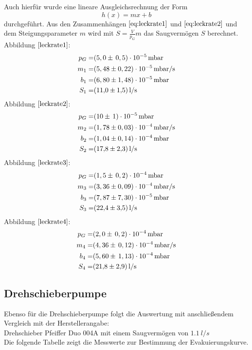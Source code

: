Auch hierfür wurde eine lineare Ausgleichsrechnung der Form
\begin{equation}
	h(x)=mx+b
\end{equation}
durchgeführt.
Aus den Zusammenhängen $\ref{eq:leckrate1}$ und $\ref{eq:leckrate2}$ und dem Steigungsparameter $m$ wird mit $S=\frac{V}{p_G}m$
das Saugvermögen $S$ berechnet.\\

Abbildung $\ref{leckrate1}$:
	\begin{align*}
		p_G=& (5,0 \pm \, 0,5)\cdot 10^{-5} \, \si{mbar}\\
		m_1=& (5,48 \pm 0,22)\cdot 10^{-5} \, \si{mbar/s}\\
		b_1=& (6,80 \pm 1,48)\cdot 10^{-5} \, \si{mbar}\\
		S_1=& \SI{11,0 \pm 1,5}{l/s}
	\end{align*}
	Abbildung $\ref{leckrate2}$:
		\begin{align*}
			p_G=& (10 \pm \, 1)\cdot 10^{-5} \, \si{mbar}\\
			m_2=& (1,78 \pm 0,03)\cdot 10^{-4} \, \si{mbar/s}\\
			b_2=& (1,04 \pm 0,14)\cdot 10^{-4} \, \si{mbar}\\
			S_2=& \SI{17,8 \pm 2,3}{l/s}
		\end{align*}
		Abbildung $\ref{leckrate3}$:
			\begin{align*}
				p_G=& (1,5 \pm \, 0,2)\cdot 10^{-4} \, \si{mbar}\\
				m_3=& (3,36 \pm 0,09)\cdot 10^{-4} \, \si{mbar/s}\\
				b_3=& (7,87 \pm 7,30)\cdot 10^{-5} \, \si{mbar}\\
				S_3=& \SI{22,4 \pm 3,5}{l/s}
			\end{align*}
		Abbildung $\ref{leckrate4}$:
			\begin{align*}
				p_G=& (2,0 \pm \, 0,2)\cdot 10^{-4} \, \si{mbar}\\
				m_4=& (4,36 \pm \, 0,12)\cdot 10^{-4} \, \si{mbar/s}\\
				b_4=& (5,60 \pm \, 1,13)\cdot 10^{-4} \, \si{mbar}\\
				S_4=& \SI{21,8 \pm 2,9}{l/s}
			\end{align*}

\subsection{Drehschieberpumpe}
Ebenso für die Drehschieberpumpe folgt die Auswertung mit anschließendem Vergleich mit der
Herstellerangabe\cite{anleitung}:\\
Drehschieber Pfeiffer Duo 004A mit einem Saugvermögen von $\SI{1,1}{l/s}$\\
Die folgende Tabelle zeigt die Messwerte zur Bestimmung der Evakuierungskurve.
